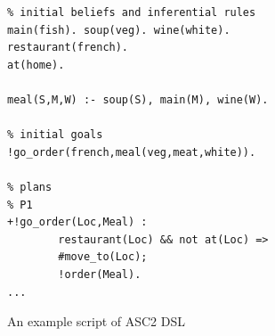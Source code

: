 \begin{listing}[!tbh]
\centering
\begin{tcolorbox}[left=2pt,right=2pt,top=2pt,bottom=2pt,arc=0pt,
                  boxrule=0pt,toprule=1pt,
                  colback=white]
\begin{verbatim}
% initial beliefs and inferential rules
main(fish). soup(veg). wine(white).
restaurant(french).
at(home).

meal(S,M,W) :- soup(S), main(M), wine(W).

% initial goals
!go_order(french,meal(veg,meat,white)).

% plans
% P1
+!go_order(Loc,Meal) :
        restaurant(Loc) && not at(Loc) =>
        #move_to(Loc);
        !order(Meal).
...
\end{verbatim}
\end{tcolorbox}
\caption{An example script of ASC2 DSL}
\label{lst:domestic_robot}

\end{listing}









